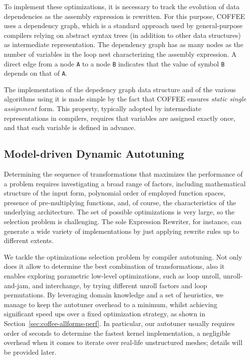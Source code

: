 To implement these optimizations, it is necessary to track the evolution of data dependencies as the assembly expression is rewritten. For this purpose, COFFEE uses a dependency graph, which is a standard approach used by general-purpose compilers relying on abstract syntax trees (in addition to other data structures) as intermediate representation. The dependency graph has as many nodes as the number of variables in the loop nest characterizing the assembly expression. A direct edge from a node \texttt{A} to a node \texttt{B} indicates that the value of symbol \texttt{B} depends on that of \texttt{A}. 

The implementation of the depedency graph data structure and of the various algorithms using it is made simple by the fact that COFFEE ensures \textit{static single assignment} form. This property, typically adopted by intermediate representations in compilers, requires that variables are assigned exactly once, and that each variable is defined in advance. 


\subsection{Model-driven Dynamic Autotuning}
\label{sec:coffee-autotune}

Determining the sequence of transformations that maximizes the performance of a problem requires investigating a broad range of factors, including mathematical structure of the input form, polynomial order of employed function spaces, presence of pre-multiplying functions, and, of course, the characteristics of the underlying architecture. The set of possible optimizations is very large, so the selection problem is challenging. The sole Expression Rewriter, for instance, can generate a wide variety of implementations by just applying rewrite rules up to different extents.  

We tackle the optimizations selection problem by compiler autotuning. Not only does it allow to determine the best combination of transformations, also it enables exploring parametric low-level optimizations, such as loop unroll, unroll-and-jam, and interchange, by trying different unroll factors and loop permutations. By leveraging domain knowledge and a set of heuristics, we manage to keep the autotuner overhead to a minimum, whilst achieving significant speed ups over a fixed optimization strategy, as shown in Section~\ref{sec:coffee-allforms-perf}. In particular, our autotuner usually requires order of seconds to determine the fastest kernel implementation, a negligible overhead when it comes to iterate over real-life unstructured meshes; details will be provided later.


